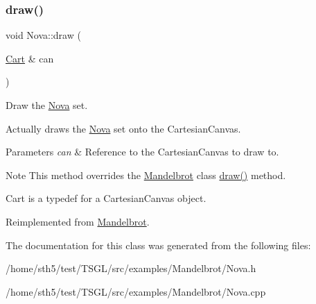 \subsubsection{\texorpdfstring{draw()}{draw()}}
{\footnotesize\ttfamily void Nova\+::draw (\begin{DoxyParamCaption}\item[{\hyperlink{classtsgl_1_1_cartesian_canvas}{Cart} \&}]{can }\end{DoxyParamCaption})\hspace{0.3cm}{\ttfamily [virtual]}}



Draw the \hyperlink{class_nova}{Nova} set. 

Actually draws the \hyperlink{class_nova}{Nova} set onto the Cartesian\+Canvas. 
\begin{DoxyParams}{Parameters}
{\em can} & Reference to the Cartesian\+Canvas to draw to. \\
\hline
\end{DoxyParams}
\begin{DoxyNote}{Note}
This method overrides the \hyperlink{class_mandelbrot}{Mandelbrot} class\textquotesingle{} \hyperlink{class_nova_a66935ba0814dfabcae2481c128c336ec}{draw()} method. 

Cart is a typedef for a Cartesian\+Canvas object. 
\end{DoxyNote}


Reimplemented from \hyperlink{class_mandelbrot_ab7918e4de8f00f73290f110ca7a6cffd}{Mandelbrot}.



The documentation for this class was generated from the following files\+:\begin{DoxyCompactItemize}
\item 
/home/sth5/test/\+T\+S\+G\+L/src/examples/\+Mandelbrot/Nova.\+h\item 
/home/sth5/test/\+T\+S\+G\+L/src/examples/\+Mandelbrot/Nova.\+cpp\end{DoxyCompactItemize}
